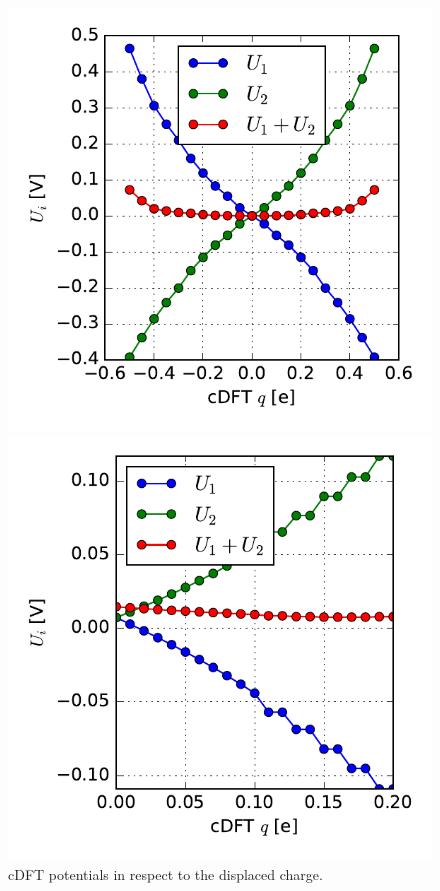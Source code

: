 \begin{figure}
	\centering
	\begin{minipage}{0.49\textwidth}
		\centering
			\includegraphics[width = \textwidth]{Images/Hydrogen/charging/potential_q_1}
			\caption{cDFT potentials in respect to the displaced charge.\\ \\ \\}
			\label{image_potentials_qs_1}
		\end{minipage}\hspace*{.5cm}
		\begin{minipage}{0.49\textwidth}
				\centering
				\includegraphics[width = \textwidth]{Images/Hydrogen/charging/Potential_asymmetry}

\end{minipage}
\end{figure}
